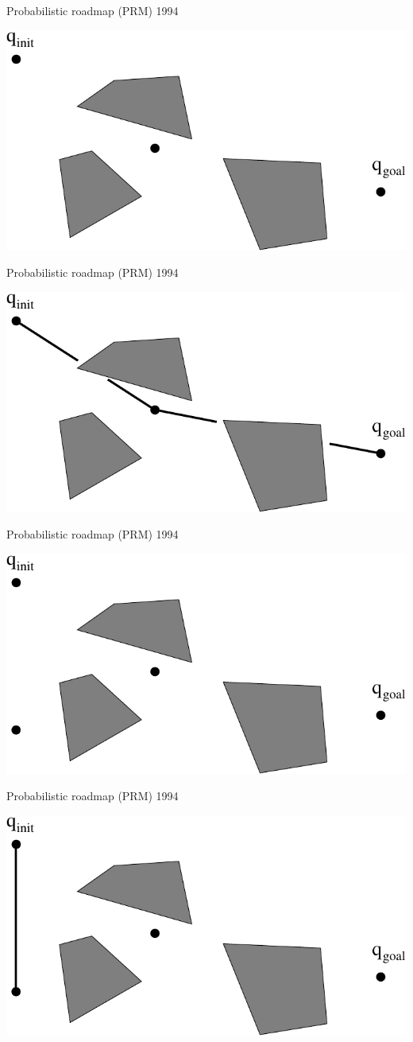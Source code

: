 \begin{frame} {Probabilistic roadmap (PRM) 1994}
\centerline {
  \includegraphics[width=.8\linewidth]{figures/PRM3.pdf}
}
\end{frame}

\begin{frame} {Probabilistic roadmap (PRM) 1994}
\centerline {
  \includegraphics[width=.8\linewidth]{figures/PRM4.pdf}
}
\end{frame}

\begin{frame} {Probabilistic roadmap (PRM) 1994}
\centerline {
  \includegraphics[width=.8\linewidth]{figures/PRM5.pdf}
}
\end{frame}

\begin{frame} {Probabilistic roadmap (PRM) 1994}
\centerline {
  \includegraphics[width=.8\linewidth]{figures/PRM6.pdf}
}
\end{frame}

